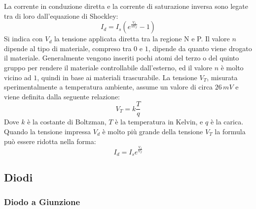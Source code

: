 \documentclass{article}
\numberwithin{equation}{subsection}
\begin{document}
La corrente in conduzione diretta e la corrente di saturazione inversa sono legate tra di loro dall'equazione di Shockley:
\begin{equation}
    I_d=\displaystyle I_s\left(e^{\frac{V_d}{nV_T}}-1\right)
\end{equation}
Si indica con $V_d$ la tensione applicata diretta tra la regione N e P. Il valore $n$ dipende al tipo di materiale, compreso tra $0$ e $1$, dipende da quanto viene 
drogato il materiale. Generalmente vengono 
inseriti pochi atomi del terzo o del quinto gruppo per rendere il materiale controllabile dall'esterno, ed il valore $n$ è molto vicino ad $1$, quindi in base ai materiali 
trascurabile. 
La tensione $V_T$, misurata sperimentalmente a temperatura ambiente, assume un valore di circa $26\,mV$ e viene definita dalla seguente relazione:
\begin{equation}
    V_T=\displaystyle k\frac{T}{q}
\end{equation}
Dove $k$ è la costante di Boltzman, $T$ è la temperatura in Kelvin, e $q$ è la carica.
Quando la tensione impressa $V_d$ è molto più grande della tensione $V_T$ la formula può essere ridotta nella forma:
\begin{equation}
    I_d=I_se^{\frac{V_d}{V_T}}
\end{equation} 

\subsection{Diodi}

\subsubsection{Diodo a Giunzione}
\end{document}
